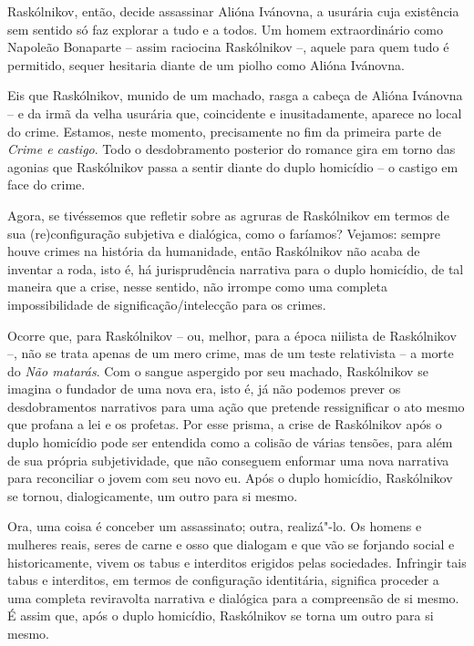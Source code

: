 Raskólnikov, então, decide assassinar Alióna Ivánovna, a usurária cuja
existência sem sentido só faz explorar a tudo e a todos. Um homem
extraordinário como Napoleão Bonaparte -- assim raciocina Raskólnikov
--, aquele para quem tudo é permitido, sequer hesitaria diante de um
piolho como Alióna Ivánovna.

Eis que Raskólnikov, munido de um machado, rasga a cabeça de Alióna
Ivánovna -- e da irmã da velha usurária que, coincidente e
inusitadamente, aparece no local do crime. Estamos, neste momento,
precisamente no fim da primeira parte de \emph{Crime e castigo}. Todo o
desdobramento posterior do romance gira em torno das agonias que
Raskólnikov passa a sentir diante do duplo homicídio -- o castigo em
face do crime.

Agora, se tivéssemos que refletir sobre as agruras de Raskólnikov em
termos de sua (re)configuração subjetiva e dialógica, como o faríamos?
Vejamos: sempre houve crimes na história da humanidade, então
Raskólnikov não acaba de inventar a roda, isto é, há jurisprudência
narrativa para o duplo homicídio, de tal maneira que a crise, nesse
sentido, não irrompe como uma completa impossibilidade de
significação/intelecção para os crimes.

Ocorre que, para Raskólnikov -- ou, melhor, para a época niilista de
Raskólnikov --, não se trata apenas de um mero crime, mas de um teste
relativista -- a morte do \emph{Não matarás}. Com o sangue aspergido por
seu machado, Raskólnikov se imagina o fundador de uma nova era, isto é,
já não podemos prever os desdobramentos narrativos para uma ação que
pretende ressignificar o ato mesmo que profana a lei e os profetas. Por
esse prisma, a crise de Raskólnikov após o duplo homicídio pode ser
entendida como a colisão de várias tensões, para além de sua própria
subjetividade, que não conseguem enformar uma nova narrativa para
reconciliar o jovem com seu novo eu. Após o duplo homicídio, Raskólnikov
se tornou, dialogicamente, um outro para si mesmo.

Ora, uma coisa é conceber um assassinato; outra, realizá"-lo. Os homens e
mulheres reais, seres de carne e osso que dialogam e que vão se forjando
social e historicamente, vivem os tabus e interditos erigidos pelas
sociedades. Infringir tais tabus e interditos, em termos de configuração
identitária, significa proceder a uma completa reviravolta narrativa e
dialógica para a compreensão de si mesmo. É assim que, após o duplo
homicídio, Raskólnikov se torna um outro para si mesmo.

